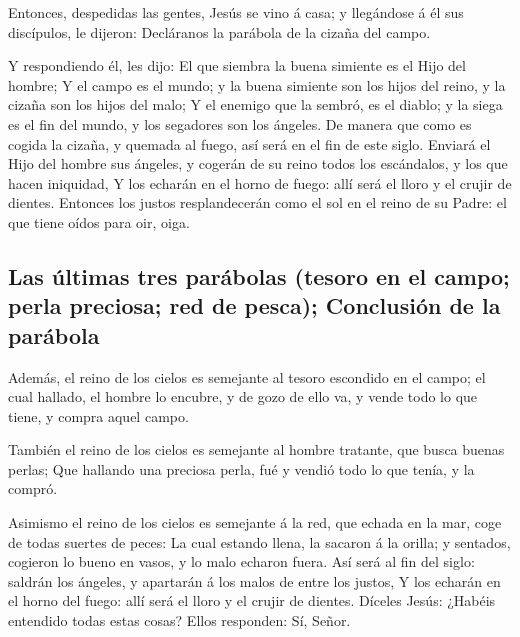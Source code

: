 Entonces, despedidas las gentes, Jesús se vino á casa; y
llegándose á él sus discípulos, le dijeron: Decláranos la parábola de la
cizaña del campo.

 Y respondiendo él, les dijo: El que siembra la buena
simiente es el Hijo del hombre;  Y el campo es el mundo;
y la buena simiente son los hijos del reino, y la cizaña son los hijos
del malo;  Y el enemigo que la sembró, es el diablo; y la
siega es el fin del mundo, y los segadores son los ángeles.
 De manera que como es cogida la cizaña, y quemada al
fuego, así será en el fin de este siglo.  Enviará el Hijo
del hombre sus ángeles, y cogerán de su reino todos los escándalos, y
los que hacen iniquidad,  Y los echarán en el horno de
fuego: allí será el lloro y el crujir de dientes. 
Entonces los justos resplandecerán como el sol en el reino de su Padre:
el que tiene oídos para oir, oiga.

\hypertarget{las-uxfaltimas-tres-paruxe1bolas-tesoro-en-el-campo-perla-preciosa-red-de-pesca-conclusiuxf3n-de-la-paruxe1bola}{%
\subsection{Las últimas tres parábolas (tesoro en el campo; perla
preciosa; red de pesca); Conclusión de la
parábola}\label{las-uxfaltimas-tres-paruxe1bolas-tesoro-en-el-campo-perla-preciosa-red-de-pesca-conclusiuxf3n-de-la-paruxe1bola}}

 Además, el reino de los cielos es semejante al tesoro
escondido en el campo; el cual hallado, el hombre lo encubre, y de gozo
de ello va, y vende todo lo que tiene, y compra aquel campo.

 También el reino de los cielos es semejante al hombre
tratante, que busca buenas perlas;  Que hallando una
preciosa perla, fué y vendió todo lo que tenía, y la compró.

 Asimismo el reino de los cielos es semejante á la red,
que echada en la mar, coge de todas suertes de peces:  La
cual estando llena, la sacaron á la orilla; y sentados, cogieron lo
bueno en vasos, y lo malo echaron fuera.  Así será al fin
del siglo: saldrán los ángeles, y apartarán á los malos de entre los
justos,  Y los echarán en el horno del fuego: allí será
el lloro y el crujir de dientes.  Díceles Jesús: ¿Habéis
entendido todas estas cosas? Ellos responden: Sí, Señor.

